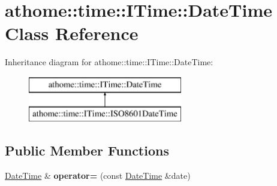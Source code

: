 \hypertarget{classathome_1_1time_1_1_i_time_1_1_date_time}{}\section{athome\+:\+:time\+:\+:I\+Time\+:\+:Date\+Time Class Reference}
\label{classathome_1_1time_1_1_i_time_1_1_date_time}
Inheritance diagram for athome\+:\+:time\+:\+:I\+Time\+:\+:Date\+Time\+:\begin{figure}[H]
\begin{center}
\leavevmode
\includegraphics[height=2.000000cm]{classathome_1_1time_1_1_i_time_1_1_date_time}
\end{center}
\end{figure}
\subsection*{Public Member Functions}
\begin{DoxyCompactItemize}
\item 
\mbox{\label{classathome_1_1time_1_1_i_time_1_1_date_time_a0380ffd91df34e5f59f7e24a0d31690e}} 
\mbox{\hyperlink{classathome_1_1time_1_1_i_time_1_1_date_time}{Date\+Time}} \& {\bfseries operator=} (const \mbox{\hyperlink{classathome_1_1time_1_1_i_time_1_1_date_time}{Date\+Time}} \&date)
\end{DoxyCompactItemize}

